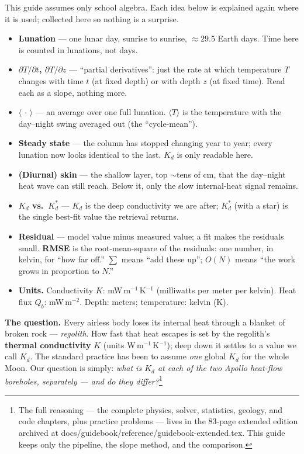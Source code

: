 \documentclass[11pt]{report}
\newcommand{\code}[1]{{\ttfamily\small #1}}
\begin{document}
\begin{plain}[title={\sffamily\bfseries Reading this guide --- the few basics you'll need}]
This guide assumes only school algebra. Each idea below is explained again where it is
used; collected here so nothing is a surprise.
\begin{itemize}[leftmargin=1.2em,itemsep=1pt,topsep=2pt]
\item \textbf{Lunation} --- one lunar day, sunrise to sunrise, $\approx29.5$ Earth days.
  Time here is counted in lunations, not days.
\item \textbf{$\partial T/\partial t$, $\partial T/\partial z$} --- ``partial derivatives'':
  just the rate at which temperature $T$ changes with time $t$ (at fixed depth) or with
  depth $z$ (at fixed time). Read each as a slope, nothing more.
\item \textbf{$\langle\,\cdot\,\rangle$} --- an average over one full lunation. $\langle
  T\rangle$ is the temperature with the day--night swing averaged out (the ``cycle-mean'').
\item \textbf{Steady state} --- the column has stopped changing year to year; every
  lunation now looks identical to the last. $K_d$ is only readable here.
\item \textbf{(Diurnal) skin} --- the shallow layer, top $\sim$tens of cm, that the
  day--night heat wave can still reach. Below it, only the slow internal-heat signal remains.
\item \textbf{$K_d$ vs.\ $K_d^{*}$} --- $K_d$ is the deep conductivity we are after;
  $K_d^{*}$ (with a star) is the single best-fit value the retrieval returns.
\item \textbf{Residual} --- model value minus measured value; a fit makes the residuals small.
  \textbf{RMSE} is the root-mean-square of the residuals: one number, in kelvin, for ``how
  far off.'' \textbf{$\textstyle\sum$} means ``add these up''; \textbf{$O(N)$} means ``the
  work grows in proportion to $N$.''
\item \textbf{Units.} Conductivity $K$: mW\,m$^{-1}$\,K$^{-1}$ (milliwatts per meter per
  kelvin). Heat flux $Q_b$: mW\,m$^{-2}$. Depth: meters; temperature: kelvin (K).
\end{itemize}
\end{plain}

\noindent\textbf{The question.} Every airless body loses its internal heat
through a blanket of broken rock --- \emph{regolith}. How fast that heat escapes
is set by the regolith's \textbf{thermal conductivity} $K$ (units
W\,m$^{-1}$\,K$^{-1}$); deep down it settles to a value we call $K_d$. The
standard practice has been to assume \emph{one} global $K_d$ for the whole Moon.
Our question is simply: \emph{what is $K_d$ at each of the two Apollo heat-flow
boreholes, separately --- and do they differ?}\footnote{The full reasoning ---
the complete physics, solver, statistics, geology, and code chapters, plus
practice problems --- lives in the 83-page extended edition archived at
\code{docs/guidebook/reference/guidebook-extended.tex}. This guide keeps only
the pipeline, the slope method, and the comparison.}
\end{document}
